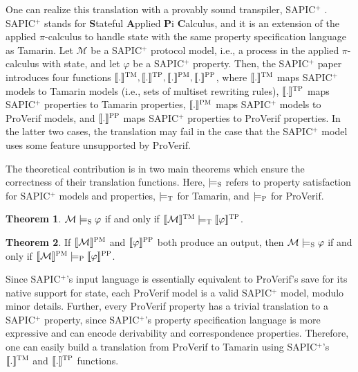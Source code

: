 \documentclass{article}
\theoremstyle{definition}
\newtheorem{theorem}{Theorem}
\begin{document}
One can realize this translation with a provably sound transpiler, SAPIC$^+$ \cite{sapic}. 
SAPIC$^+$ stands for \textbf{S}tateful \textbf{A}pplied \textbf{P}i \textbf{C}alculus, 
and it is an extension of the applied $\pi$-calculus to handle state with the same property 
specification language as Tamarin. Let $\mathcal{M}$ be a SAPIC$^+$ protocol model, 
i.e., a process in the applied $\pi$-calculus with state, and let $\varphi$ be a SAPIC$^+$ property. 
Then, the SAPIC$^+$ paper introduces four functions $\llbracket . \rrbracket^{\textsc{TM}}, 
\llbracket . \rrbracket^{\textsc{TP}}, \llbracket . \rrbracket^{\textsc{PM}}, 
\llbracket . \rrbracket^{\textsc{PP}}$, where $\llbracket . \rrbracket^{\textsc{TM}}$ maps 
SAPIC$^+$ models to Tamarin models (i.e., sets of multiset rewriting rules), 
$\llbracket . \rrbracket^{\textsc{TP}}$ maps SAPIC$^+$ properties to Tamarin properties, 
$\llbracket. \rrbracket^{\textsc{PM}}$ maps SAPIC$^+$ models to ProVerif models, and 
$\llbracket . \rrbracket^{\textsc{PP}}$ maps SAPIC$^+$ properties to ProVerif properties. 
In the latter two cases, the translation may fail in the case that the SAPIC$^+$ model 
uses some feature unsupported by ProVerif. 

The theoretical contribution is in two main theorems which ensure the correctness of their translation functions. Here, $\models_{\textsc{S}}$ refers to property satisfaction for SAPIC$^+$ models and properties, $\models_{\textsc{T}}$ for Tamarin, and $\models_{\textsc{P}}$ for ProVerif. 

\begin{theorem}
    $\mathcal{M} \models_{\textsc{S}} \varphi$ if and only if $\llbracket \mathcal{M} \rrbracket^{\textsc{TM}} \models_{\textsc{T}} \llbracket \varphi \rrbracket^{\textsc{TP}}$.
\end{theorem}

\begin{theorem}
    If $\llbracket \mathcal{M} \rrbracket^{\textsc{PM}}$ and $\llbracket \varphi \rrbracket^{\textsc{PP}}$ both  produce an output, then $\mathcal{M} \models_{\textsc{S}} \varphi$ if and only if $\llbracket \mathcal{M} \rrbracket^{\textsc{PM}} \models_{\textsc{P}} \llbracket \varphi \rrbracket^{\textsc{PP}}$.
\end{theorem}

Since SAPIC$^+$'s input language is essentially equivalent to ProVerif's save for its native support for state, each ProVerif model is a valid SAPIC$^+$ model, modulo minor details.
Further, every ProVerif property has a trivial translation to a SAPIC$^+$ property, 
since SAPIC$^+$'s property specification language is more expressive and can encode derivability and correspondence properties. 
Therefore, one can easily build a translation from ProVerif to Tamarin using 
SAPIC$^+$'s $\llbracket . \rrbracket^{\textsc{TM}}$ and $ \llbracket . \rrbracket^{\textsc{TP}}$ functions.
\end{document}
